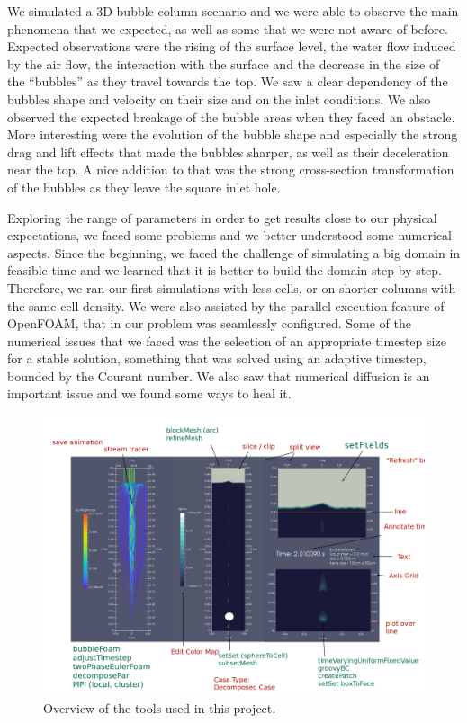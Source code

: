 \documentclass[11pt, a4paper, twoside]{article}
\begin{document}
We simulated a 3D bubble column scenario and we were able to observe the main phenomena that we expected, as well as some that we were not aware of before. Expected observations were the rising of the surface level, the water flow induced by the air flow, the interaction with the surface and the decrease in the size of the ``bubbles'' as they travel towards the top. We saw a clear dependency of the bubbles shape and velocity on their size and on the inlet conditions. We also observed the expected breakage of the bubble areas when they faced an obstacle. More interesting were the evolution of the bubble shape and especially the strong drag and lift effects that made the bubbles sharper, as well as their deceleration near the top. A nice addition to that was the strong cross-section transformation of the bubbles as they leave the square inlet hole.

Exploring the range of parameters in order to get results close to our physical expectations, we faced some problems and we better understood some numerical aspects. Since the beginning, we faced the challenge of simulating a big domain in feasible time and we learned that it is better to build the domain step-by-step. Therefore, we ran our first simulations with less cells, or on shorter columns with the same cell density. We were also assisted by the parallel execution feature of OpenFOAM, that in our problem was seamlessly configured. Some of the numerical issues that we faced was the selection of an appropriate timestep size for a stable solution, something that was solved using an adaptive timestep, bounded by the Courant number. We also saw that numerical diffusion is an important issue and we found some ways to heal it.

\begin{figure}
    \centering
    \includegraphics[width=\textwidth]{figures/overview}
    \caption{Overview of the tools used in this project.}
    \label{fig:overview}
\end{figure}
\end{document}
